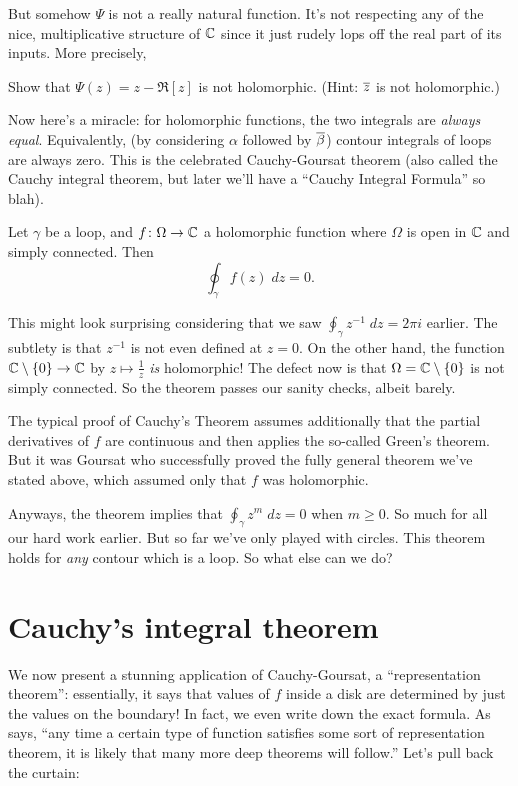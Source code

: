 But somehow $\Psi$ is not a really natural function.
It's not respecting any of the nice, multiplicative structure of $\mathbb C$ since
it just rudely lops off the real part of its inputs.
More precisely,
\begin{ques}
	Show that $\Psi(z) = z - \Re[z]$ is not holomorphic.
	(Hint: $\overline z$ is not holomorphic.)
\end{ques}

Now here's a miracle: for holomorphic functions, the two integrals are \emph{always equal}.
Equivalently, (by considering $\alpha$ followed by $\overline\beta$) contour integrals of loops are always zero.
This is the celebrated Cauchy-Goursat theorem
(also called the Cauchy integral theorem,
but later we'll have a ``Cauchy Integral Formula'' so blah).

\begin{theorem}
	Let $\gamma$ be a loop, and $f \colon \Omega \to \mathbb C$ a holomorphic function
	where $\Omega$ is open in $\mathbb C$ and simply connected.
	Then
	\[ \oint_\gamma f(z) \; dz = 0. \]
\end{theorem}
\begin{remark}
	This might look surprising considering that we saw $\oint_\gamma z^{-1} \; dz = 2 \pi i$ earlier.
	The subtlety is that $z^{-1}$ is not even defined at $z = 0$.
	On the other hand, the function $\mathbb C \setminus \{0\} \to \mathbb C$ by $z \mapsto \frac 1z$ \emph{is} holomorphic!
	The defect now is that $\Omega = \mathbb C \setminus \{0\}$ is not simply connected.
	So the theorem passes our sanity checks, albeit barely.
\end{remark}

The typical proof of Cauchy's Theorem assumes additionally
that the partial derivatives of $f$ are continuous
and then applies the so-called Green's theorem.
But it was Goursat who successfully proved the fully general theorem we've stated above,
which assumed only that $f$ was holomorphic.

Anyways, the theorem implies that $\oint_\gamma z^m \; dz = 0$ when $m \ge 0$.
So much for all our hard work earlier.
But so far we've only played with circles.
This theorem holds for \emph{any} contour which is a loop.
So what else can we do?

\section{Cauchy's integral theorem}
We now present a stunning application of Cauchy-Goursat, a ``representation theorem'':
essentially, it says that values of $f$ inside a disk
are determined by just the values on the boundary!
In fact, we even write down the exact formula.
As \cite{ref:dartmouth} says,
``any time a certain type of function satisfies some sort of representation theorem,
it is likely that many more deep theorems will follow.''
Let's pull back the curtain:

